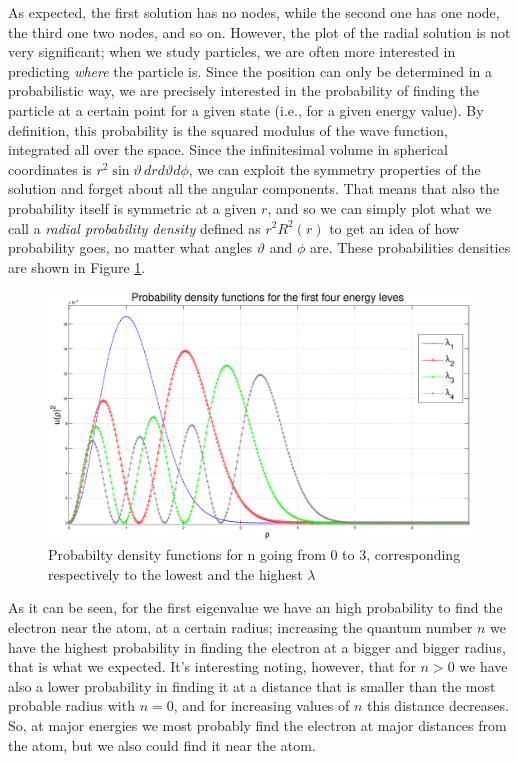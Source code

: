 \documentclass {article}
\begin{document}
As expected, the first solution has no nodes, while the second one has one node, the third one two nodes, and so on. However, the plot of the radial solution is not very significant; when we study particles, we are often more interested in predicting \emph{where} the particle is. Since the position can only be determined in a probabilistic way, we are precisely interested in the probability of finding the particle at a certain point for a given state (i.e., for a given energy value). By definition, this probability is the squared modulus of the wave function, integrated all over the space. Since the infinitesimal volume in spherical coordinates is $r^2\sin\vartheta\,dr d\vartheta d\phi$, we can exploit the symmetry properties of the solution and forget about all the angular components. That means that also the probability itself is symmetric at a given $r$, and so we can simply plot what we call a \emph{radial probability density} defined as $r^2R^2(r)$ to get an idea of how probability goes, no matter what angles $\vartheta$ and $\phi$ are. These probabilities densities are shown in Figure \ref{fig:probability_densities_one_electron}. 


\begin{figure}[H]
	\centering
	\includegraphics[width=16cm]{funct}
	\caption{Probabilty density functions for n going from 0 to 3, corresponding respectively to the lowest and the highest $\lambda$}
	\label{fig:probability_densities_one_electron}
\end{figure}

As it can be seen, for the first eigenvalue we have an high probability to find the electron near the atom, at a certain radius; increasing the quantum number $n$ we have the highest probability in finding the electron at a bigger and bigger radius, that is what we expected. It's interesting noting, however, that for $n>0$ we have also a lower probability in finding it at a distance that is smaller than the most probable radius with $n=0$, and for increasing values of $n$ this distance decreases. So, at major energies we most probably find the electron at major distances from the atom, but we also could find it near the atom.
\end{document}
